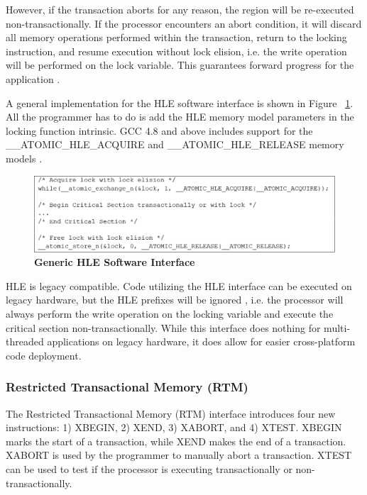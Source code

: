 \documentclass[a4paper]{article}
\begin{document}
\indent 
However, if the transaction aborts for any reason, the region will be
re-executed non-transactionally.  If the processor encounters an abort
condition, it will discard all memory operations performed within the
transaction, return to the locking instruction, and resume execution without
lock elision, i.e. the write operation will be performed on the lock variable.
This guarantees forward progress for the application \cite{intel_prog_ref}.
\par

\indent 
A general implementation for the HLE software interface is shown in Figure
~\ref{fig:hle_interface}.  All the programmer has to do is add the HLE memory
model parameters in the locking function intrinsic.  GCC 4.8 and above includes
support for the \_\_ATOMIC\_HLE\_ACQUIRE and \_\_ATOMIC\_HLE\_RELEASE memory
models \cite{gcc}.
\par

\begin{figure}[H]
    \centering
    \graphicspath{ {./figures/} }
    \includegraphics[width=\textwidth,height=\textheight,keepaspectratio]{fig_hleInterface}
    \caption{\textbf{Generic HLE Software Interface}}
    \label{fig:hle_interface}
\end{figure}

\indent
HLE is legacy compatible.  Code utilizing the HLE interface can be executed on
legacy hardware, but the HLE prefixes will be ignored \cite{intel_prog_ref},
i.e. the processor will always perform the write operation on the locking
variable and execute the critical section non-transactionally.  While this
interface does nothing for multi-threaded applications on legacy hardware, it
does allow for easier cross-platform code deployment.
\par

\subsubsection{\textbf{Restricted Transactional Memory (RTM)}}

\indent 
The Restricted Transactional Memory (RTM) interface introduces four new
instructions: 1) XBEGIN, 2) XEND, 3) XABORT, and 4) XTEST.  XBEGIN marks the
start of a transaction, while XEND makes the end of a transaction.  XABORT is
used by the programmer to manually abort a transaction.  XTEST can be used to
test if the processor is executing transactionally or non-transactionally.
\par
\end{document}
